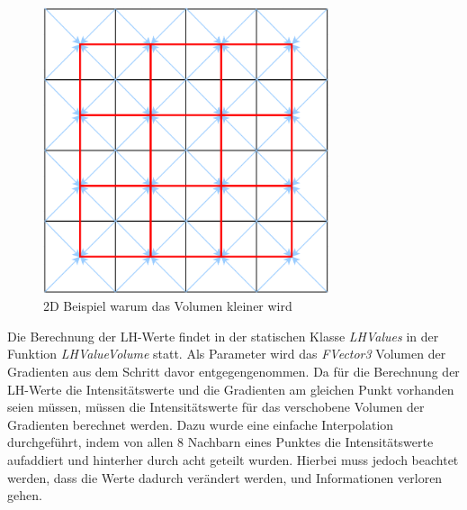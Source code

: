 \begin{figure}
\centering 
\includegraphics[width=0.75\textwidth]{Logos/VoxelShift.png}
\caption{2D Beispiel warum das Volumen kleiner wird} 
\label{fig:shift} 
\end{figure}



Die Berechnung der LH-Werte findet in der statischen Klasse \textit{LHValues} in der Funktion \textit{LHValueVolume} statt. Als Parameter wird das \textit{FVector3} Volumen der Gradienten aus dem Schritt davor entgegengenommen. Da für die Berechnung der LH-Werte die Intensitätswerte und die Gradienten am gleichen Punkt vorhanden seien müssen, müssen die Intensitätswerte für das verschobene Volumen der Gradienten berechnet werden. Dazu wurde eine einfache Interpolation durchgeführt, indem von allen 8 Nachbarn eines Punktes die Intensitätswerte aufaddiert und hinterher durch acht geteilt wurden. Hierbei muss jedoch beachtet werden, dass die Werte dadurch verändert werden, und Informationen verloren gehen.


